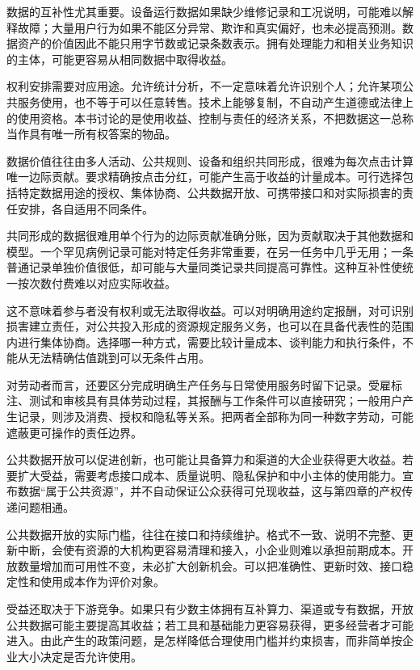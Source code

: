 \documentclass[UTF8,fontset=fandol,zihao=-4,oneside,openany]{ctexbook}
\begin{document}
数据的互补性尤其重要。设备运行数据如果缺少维修记录和工况说明，可能难以解释故障；大量用户行为如果不能区分异常、欺诈和真实偏好，也未必提高预测。数据资产的价值因此不能只用字节数或记录条数表示。拥有处理能力和相关业务知识的主体，可能更容易从相同数据中取得收益。

权利安排需要对应用途。允许统计分析，不一定意味着允许识别个人；允许某项公共服务使用，也不等于可以任意转售。技术上能够复制，不自动产生道德或法律上的使用资格。本书讨论的是使用收益、控制与责任的经济关系，不把数据这一总称当作具有唯一所有权答案的物品。

数据价值往往由多人活动、公共规则、设备和组织共同形成，很难为每次点击计算唯一边际贡献。要求精确按点击分红，可能产生高于收益的计量成本。可行选择包括特定数据用途的授权、集体协商、公共数据开放、可携带接口和对实际损害的责任安排，各自适用不同条件。

\label{arg:P188}
共同形成的数据很难用单个行为的边际贡献准确分账，因为贡献取决于其他数据和模型。一个罕见病例记录可能对特定任务非常重要，在另一任务中几乎无用；一条普通记录单独价值很低，却可能与大量同类记录共同提高可靠性。这种互补性使统一按次数付费难以对应实际收益。

这不意味着参与者没有权利或无法取得收益。可以对明确用途约定报酬，对可识别损害建立责任，对公共投入形成的资源规定服务义务，也可以在具备代表性的范围内进行集体协商。选择哪一种方式，需要比较计量成本、谈判能力和执行条件，不能从无法精确估值跳到可以无条件占用。

对劳动者而言，还要区分完成明确生产任务与日常使用服务时留下记录。受雇标注、测试和审核具有具体劳动过程，其报酬与工作条件可以直接研究；一般用户产生记录，则涉及消费、授权和隐私等关系。把两者全部称为同一种数字劳动，可能遮蔽更可操作的责任边界。

公共数据开放可以促进创新，也可能让具备算力和渠道的大企业获得更大收益。若要扩大受益，需要考虑接口成本、质量说明、隐私保护和中小主体的使用能力。宣布数据“属于公共资源”，并不自动保证公众获得可兑现收益，这与第四章的产权传递问题相通。

\label{arg:P189}
公共数据开放的实际门槛，往往在接口和持续维护。格式不一致、说明不完整、更新中断，会使有资源的大机构更容易清理和接入，小企业则难以承担前期成本。开放数量增加而可用性不变，未必扩大创新机会。可以把准确性、更新时效、接口稳定性和使用成本作为评价对象。

受益还取决于下游竞争。如果只有少数主体拥有互补算力、渠道或专有数据，开放公共数据可能主要提高其收益；若工具和基础能力更容易获得，更多经营者才可能进入。由此产生的政策问题，是怎样降低合理使用门槛并约束损害，而非简单按企业大小决定是否允许使用。
\end{document}
